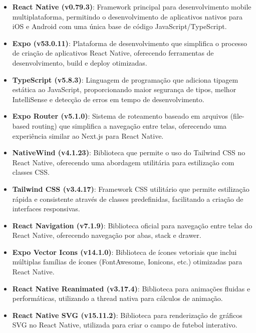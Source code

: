 \begin{itemize}
    \item \textbf{React Native (v0.79.3)}: Framework principal para desenvolvimento mobile multiplataforma, permitindo o desenvolvimento de aplicativos nativos para iOS e Android com uma única base de código JavaScript/TypeScript.
    
    \item \textbf{Expo (v53.0.11)}: Plataforma de desenvolvimento que simplifica o processo de criação de aplicativos React Native, oferecendo ferramentas de desenvolvimento, build e deploy otimizadas.
    
    \item \textbf{TypeScript (v5.8.3)}: Linguagem de programação que adiciona tipagem estática ao JavaScript, proporcionando maior segurança de tipos, melhor IntelliSense e detecção de erros em tempo de desenvolvimento.
    
    \item \textbf{Expo Router (v5.1.0)}: Sistema de roteamento baseado em arquivos (file-based routing) que simplifica a navegação entre telas, oferecendo uma experiência similar ao Next.js para React Native.
    
    \item \textbf{NativeWind (v4.1.23)}: Biblioteca que permite o uso do Tailwind CSS no React Native, oferecendo uma abordagem utilitária para estilização com classes CSS.
    
    \item \textbf{Tailwind CSS (v3.4.17)}: Framework CSS utilitário que permite estilização rápida e consistente através de classes predefinidas, facilitando a criação de interfaces responsivas.
    
    \item \textbf{React Navigation (v7.1.9)}: Biblioteca oficial para navegação entre telas do React Native, oferecendo navegação por abas, stack e drawer.
    
    \item \textbf{Expo Vector Icons (v14.1.0)}: Biblioteca de ícones vetoriais que inclui múltiplas famílias de ícones (FontAwesome, Ionicons, etc.) otimizadas para React Native.
    
    \item \textbf{React Native Reanimated (v3.17.4)}: Biblioteca para animações fluidas e performáticas, utilizando a thread nativa para cálculos de animação.
    
    \item \textbf{React Native SVG (v15.11.2)}: Biblioteca para renderização de gráficos SVG no React Native, utilizada para criar o campo de futebol interativo.
\end{itemize}

